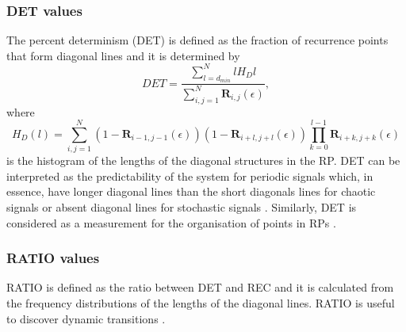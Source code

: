 \documentclass[fleqn,10pt]{wlscirep}
\begin{document}
\subsubsection*{DET values} 
The percent determinism (DET) is defined as the fraction of recurrence points
that form diagonal lines and it is determined by
\begin{equation}
DET=
	\frac{\sum^{N}_{l=d_{min}} l H_D{l} }
	     {\sum^{N}_{i,j=1} \mathbf{R}_{i,j}(\epsilon) },
\end{equation}
where 
\begin{equation}
H_D(l) = 
	\sum^{N}_{i,j=1} 
	(1- \mathbf{R}_{i-1,j-1}(\epsilon) ) 
	(1- \mathbf{R}_{i+l,j+l}(\epsilon) ) 
	\prod^{l-1}_{k=0}  \mathbf{R}_{i+k,j+k}(\epsilon)
\end{equation}
is the histogram of the lengths of the diagonal structures in the RP.
DET can be interpreted as the predictability of the system for periodic signals 
which, in essence, have longer diagonal lines than the short diagonals lines
for chaotic signals or absent diagonal lines for stochastic signals 
\cite{marwan2007, marwan2015}. Similarly, DET is considered as a measurement for 
the organisation of points in RPs  \cite{iwanski1998}. 


\subsubsection*{RATIO values}
RATIO is defined as the ratio between DET and REC and it is calculated from 
the frequency distributions of the lengths of the diagonal lines.
RATIO is useful to discover dynamic transitions \cite{marwan2015}.
% 
%
%
\end{document}
